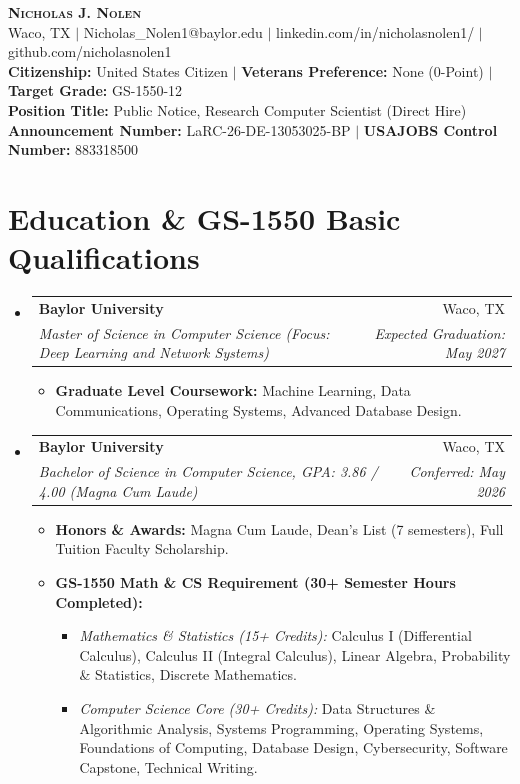 \documentclass[letterpaper,10pt]{article}
\makeatletter
\newcommand{\resumeItem}[1]{
  \item\small{
    {#1 \vspace{-2pt}}
  }
}
\newcommand{\resumeSubheading}[4]{
  \vspace{2pt}\item
    \begin{tabular*}{0.98\textwidth}[t]{l@{\extracolsep{\fill}}r}
      \textbf{#1} & #2 \\
      \textit{\small#3} & \textit{\small #4} \\
    \end{tabular*}\vspace{-4pt}
}
\newcommand{\resumeSubHeadingListStart}{\begin{itemize}[leftmargin=0.15in, label={}]}
\newcommand{\resumeSubHeadingListEnd}{\end{itemize}\vspace{-2pt}}
\newcommand{\resumeItemListStart}{\begin{itemize}[leftmargin=0.2in]}
\newcommand{\resumeItemListEnd}{\end{itemize}\vspace{-4pt}}
\makeatother
\begin{document}
\begin{center}
    {\textbf{\Huge \scshape Nicholas J. Nolen}} \\ \vspace{2pt}
    \small Waco, TX $|$ Nicholas\_Nolen1@baylor.edu $|$ linkedin.com/in/nicholasnolen1/ $|$ github.com/nicholasnolen1 \\ \vspace{2pt}
    \textbf{Citizenship:} United States Citizen $|$ \textbf{Veterans Preference:} None (0-Point) $|$ \textbf{Target Grade:} GS-1550-12 \\
    \textbf{Position Title:} Public Notice, Research Computer Scientist (Direct Hire) \\
    \textbf{Announcement Number:} LaRC-26-DE-13053025-BP $|$ \textbf{USAJOBS Control Number:} 883318500
\end{center}

\vspace{-4pt}

\section{Education \& GS-1550 Basic Qualifications}
\resumeSubHeadingListStart
  \resumeSubheading
    {Baylor University}{Waco, TX}
    {Master of Science in Computer Science (Focus: Deep Learning and Network Systems)}{Expected Graduation: May 2027}
    \resumeItemListStart
      \resumeItem{\textbf{Graduate Level Coursework:} Machine Learning, Data Communications, Operating Systems, Advanced Database Design.}
    \resumeItemListEnd

  \resumeSubheading
    {Baylor University}{Waco, TX}
    {Bachelor of Science in Computer Science, GPA: 3.86 / 4.00 (Magna Cum Laude)}{Conferred: May 2026}
    \resumeItemListStart
      \resumeItem{\textbf{Honors \& Awards:} Magna Cum Laude, Dean's List (7 semesters), Full Tuition Faculty Scholarship.}
      \resumeItem{\textbf{GS-1550 Math \& CS Requirement (30+ Semester Hours Completed):}}
      \begin{itemize}[leftmargin=0.15in]
        \item \emph{Mathematics \& Statistics (15+ Credits):} Calculus I (Differential Calculus), Calculus II (Integral Calculus), Linear Algebra, Probability \& Statistics, Discrete Mathematics.
        \item \emph{Computer Science Core (30+ Credits):} Data Structures \& Algorithmic Analysis, Systems Programming, Operating Systems, Foundations of Computing, Database Design, Cybersecurity, Software Capstone, Technical Writing.
      \end{itemize}
    \resumeItemListEnd
\resumeSubHeadingListEnd
\end{document}
